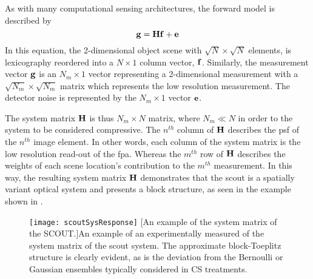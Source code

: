 As with many computational sensing architectures, the forward model is described by 
%
\begin{equation}
	\mathbf{g} = \mathbf{H} \mathbf{f} + \mathbf{e}
	\label{eq:scoutgHf}
\end{equation}
%
In this equation, the 2-dimensional object scene with $\sqrt{N} \times \sqrt{N}$ elements, is lexicography reordered into a $N \times 1$ column vector, $\mathbf{f}$. Similarly, the measurement vector $\mathbf{g}$ is an $N_m \times 1$ vector representing a 2-dimensional measurement with a $\sqrt{N_m} \times \sqrt{N_m}$ matrix which represents the low resolution measurement. The detector noise is represented by the $ N_m \times 1 $ vector $\mathbf{e}$.

The system matrix $\mathbf{H}$ is thus $N_m \times N $ matrix, where $N_m \ll N$ in order to the system to be considered compressive. The $n^{th}$ column of $\mathbf{H}$ describes the \gls{psf} of the $n^{th}$ image element. In other words, each column of the system matrix is the low resolution read-out of the \gls{fpa}. Whereas the $m^{th}$ row of $\mathbf{H}$ describes the weights of each scene location’s contribution to the $m^{th}$ measurement. In this way, the resulting system matrix $\mathbf{H}$ demonstrates that the \gls{scout} is a spatially variant optical system and presents a block structure, as seen in the example shown in .

\begin{sidewaysfigure}
	\texttt{[image: scoutSysResponse]}
	[An example of the system matrix of the SCOUT.]{An example of an experimentally measured of the system matrix of the \gls{scout} system. The approximate block-Toeplitz structure is clearly evident, as is the deviation from the Bernoulli or Gaussian ensembles typically considered in CS treatments. }
	\label{fig:scoutSysResponse}
\end{sidewaysfigure}


